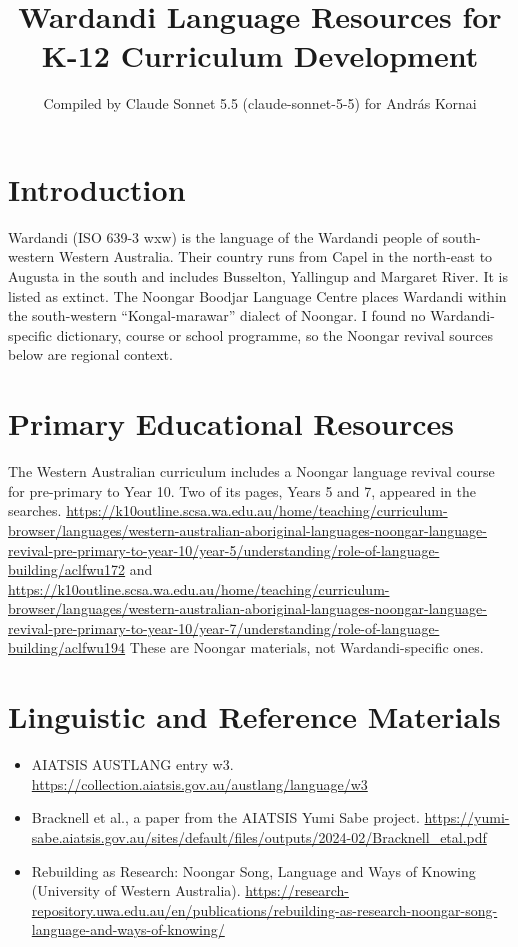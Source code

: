 \documentclass[12pt]{article}
\title{Wardandi Language Resources for K-12 Curriculum Development}
\author{Compiled by Claude Sonnet 5.5 (claude-sonnet-5-5) for Andr\'as Kornai}
\date{}
\begin{document}
\maketitle

\section{Introduction}
Wardandi (ISO 639-3 wxw) is the language of the Wardandi people of south-western Western Australia. Their country runs from Capel in the north-east to Augusta in the south and includes Busselton, Yallingup and Margaret River. It is listed as extinct. The Noongar Boodjar Language Centre places Wardandi within the south-western ``Kongal-marawar'' dialect of Noongar. I found no Wardandi-specific dictionary, course or school programme, so the Noongar revival sources below are regional context.

\section{Primary Educational Resources}
The Western Australian curriculum includes a Noongar language revival course for pre-primary to Year 10. Two of its pages, Years 5 and 7, appeared in the searches. \url{https://k10outline.scsa.wa.edu.au/home/teaching/curriculum-browser/languages/western-australian-aboriginal-languages-noongar-language-revival-pre-primary-to-year-10/year-5/understanding/role-of-language-building/aclfwu172} and \url{https://k10outline.scsa.wa.edu.au/home/teaching/curriculum-browser/languages/western-australian-aboriginal-languages-noongar-language-revival-pre-primary-to-year-10/year-7/understanding/role-of-language-building/aclfwu194} These are Noongar materials, not Wardandi-specific ones.

\section{Linguistic and Reference Materials}
\begin{itemize}
\item AIATSIS AUSTLANG entry w3. \url{https://collection.aiatsis.gov.au/austlang/language/w3}
\item Bracknell et al., a paper from the AIATSIS Yumi Sabe project. \url{https://yumi-sabe.aiatsis.gov.au/sites/default/files/outputs/2024-02/Bracknell_etal.pdf}
\item Rebuilding as Research: Noongar Song, Language and Ways of Knowing (University of Western Australia). \url{https://research-repository.uwa.edu.au/en/publications/rebuilding-as-research-noongar-song-language-and-ways-of-knowing/}
\end{itemize}
\end{document}
